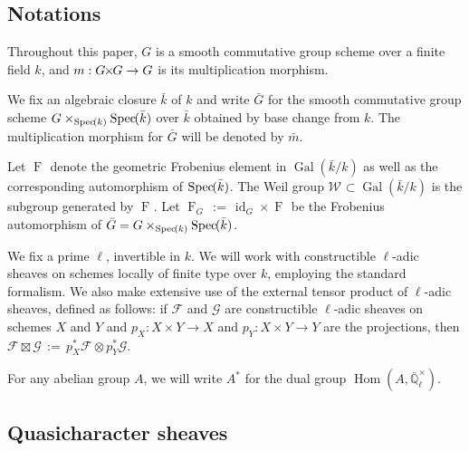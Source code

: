 \documentclass[CM,Submssn,SecEq]{degruyter-crelle} %
\theoremstyle{plain}
\theoremstyle{definition}
\theoremstyle{remark}
\newcommand{\EE}{\mathbb{\bar Q}_\ell}
\newcommand{\bFq}{\bar{k}}
\newcommand{\Fq}{k}
\newcommand{\EEx}{\EE^\times}
\newcommand{\Weil}[1]{\mathcal{W}_{#1}}
\DeclareMathOperator{\Gal}{Gal}
\newcommand{\Frob}[1]{\operatorname{F}_{#1}}
\DeclareMathOperator{\Hom}{Hom}
\DeclareMathOperator{\id}{id}
\newcommand{\Spec}[1]{{\operatorname{Spec}\hskip-1pt( #1 )}}
\newcommand{\ceq}{{\, :=\, }}
\newcommand{\bm}{\bar{m}}
\newcommand{\bG}{\bar{G}}
\newcommand{\tight}[3]{\hspace{-#1pt}{#2}\hspace{-#3pt}}
\newcommand{\GxG}{\text{$G \tight{1}{\times}{1} G$}}
\begin{document}
\subsection{Notations}\label{ssec:notation}

Throughout this paper, $G$ is a smooth commutative group scheme
over a finite field $\Fq$, and $m : \GxG\to G$ is its multiplication morphism.

We fix an algebraic closure $\bFq$ of $\Fq$ and write $\bG$ for the
smooth commutative group scheme $G \times_{\Spec{\Fq}} \Spec{\bFq}$ over $\bFq$
obtained by base change from $k$. The multiplication morphism for $\bG$ will be denoted by $\bm$.

Let $\Frob{}$ denote the geometric Frobenius element in $\Gal(\bFq/\Fq)$ as
well as the corresponding automorphism of $\Spec{\bFq}$. The Weil group
$\Weil{}\subset \Gal(\bFq/\Fq)$ is the subgroup generated by $\Frob{}$.
Let $\Frob{G} \ceq \id_{G} \times \Frob{}$ be the Frobenius automorphism of $\bG = G \times_{\Spec{\Fq}} \Spec{\bFq}$.

We fix a prime $\ell$, invertible in $\Fq$.
We will work with constructible $\ell$-adic sheaves 
on schemes locally of finite type over $\Fq$, employing the standard formalism.
We also make extensive use of the external tensor product of $\ell$-adic sheaves,
defined as follows: if $\mathcal{F}$ and $\mathcal{G}$ are constructible $\ell$-adic
sheaves on schemes $X$ and $Y$ and $p_X : X\times Y\to X$ and $p_Y : X\times Y \to Y$
are the projections, then $\mathcal{F}\boxtimes \mathcal{G} \ceq p_X^* \mathcal{F} \otimes p_Y^*\mathcal{G}$.

For any abelian group $A$, we will write $A^*$ for the dual group $\Hom(A, \EEx)$.

\subsection{Quasicharacter sheaves}\label{ssec:category}
\end{document}
